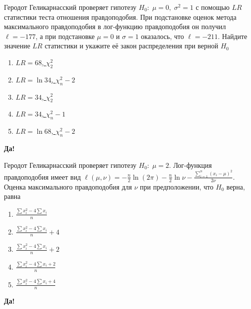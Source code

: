 \documentclass[t]{beamer}
\begin{document}
 \begin{frame} \label{19-Yes} 
\begin{block}{19} 

Геродот Геликарнасский проверяет гипотезу $H_0: \; \mu=0, \; \sigma^2=1$ с помощью $LR$ статистики теста отношения правдоподобия. При подстановке оценок метода максимального правдоподобия в лог-функцию правдоподобия он получил $\ell=-177$, а при подстановке $\mu=0$ и $\sigma=1$ оказалось, что $\ell=-211$. Найдите значение $LR$ статистики и укажите её закон распределения при верной $H_0$
 


 \end{block} 
\begin{enumerate} 
\item[] \hyperlink{19-Yes}{\beamergotobutton{} $LR=68$, $\chi^2_2$}
\item[] \hyperlink{19-No}{\beamergotobutton{} $LR=\ln 34$, $\chi^2_n-2$}
\item[] \hyperlink{19-No}{\beamergotobutton{} $LR=34$, $\chi^2_2$}
\item[] \hyperlink{19-No}{\beamergotobutton{} $LR=34$, $\chi^2_n-1$}
\item[] \hyperlink{19-No}{\beamergotobutton{} $LR=\ln 68$, $\chi^2_n-2$}
\end{enumerate} 

 \textbf{Да!} 
 \hyperlink{20}{}\end{frame} 


 \begin{frame} \label{20-Yes} 
\begin{block}{20} 

Геродот Геликарнасский проверяет гипотезу $H_0: \; \mu=2$. Лог-функция правдоподобия имеет вид $\ell(\mu,\nu)=-\frac{n}{2}\ln (2\pi)-\frac{n}{2}\ln \nu -\frac{\sum_{i=1}^n(x_i-\mu)^2}{2\nu}$. Оценка максимального правдоподобия для $\nu$ при предположении, что $H_0$ верна, равна
 


 \end{block} 
\begin{enumerate} 
\item[] \hyperlink{20-No}{\beamergotobutton{} $\frac{\sum x_i^2 - 4\sum x_i}{n}$}
\item[] \hyperlink{20-Yes}{\beamergotobutton{} $\frac{\sum x_i^2 - 4\sum x_i}{n}+4$}
\item[] \hyperlink{20-No}{\beamergotobutton{} $\frac{\sum x_i^2 - 4\sum x_i}{n}+2$}
\item[] \hyperlink{20-No}{\beamergotobutton{} $\frac{\sum x_i^2 - 4\sum x_i+2}{n}$}
\item[] \hyperlink{20-No}{\beamergotobutton{} $\frac{\sum x_i^2 - 4\sum x_i+4}{n}$}
\end{enumerate} 

 \textbf{Да!} 
 \hyperlink{21}{}\end{frame} 
\end{document}
